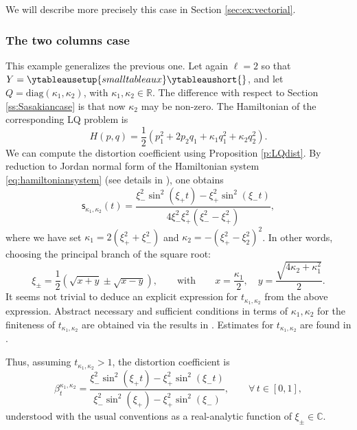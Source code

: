 \documentclass[11pt,a4paper]{article}
\theoremstyle{plain}
\theoremstyle{definition}
\theoremstyle{remark}
\numberwithin{equation}{section}
\newcommand{\R}{\mathbb{R}} %
\newcommand{\sfs}{\mathsf{s}}
\begin{document}
We will describe more precisely this case in Section \ref{sec:ex:vectorial}.

\subsubsection{The two columns case}\label{ss:twocolumnscase}

This example generalizes the previous one. Let again $\ell =2$ so that $Y=\ytableausetup{smalltableaux}\ytableaushort{\empty\empty}$, and let $Q = \mathrm{diag}(\kappa_1,\kappa_2)$, with $\kappa_1,\kappa_2 \in \R$. The difference with respect to Section \ref{ss:Sasakiancase} is that now $\kappa_2$ may be non-zero. The Hamiltonian of the corresponding LQ problem is
\begin{equation}
H(p,q) = \frac{1}{2} \left(p_1^2 +2p_{2}q_{1}+\kappa_{1} q_{1}^2+\kappa_{2}q_{2}^{2}\right).
\end{equation}
We can compute the distortion coefficient using Proposition \ref{p:LQdist}. By reduction to Jordan normal form of the Hamiltonian system \eqref{eq:hamiltoniansystem} (see details in \cite[Prop.\@ 28]{RS-3Sas}), one obtains
\begin{equation}
\sfs_{\kappa_1,\kappa_2}(t)=\frac{\xi _-^2 \sin ^2\left(\xi _+ t\right)-\xi _+^2 \sin ^2\left(\xi _- t\right)}{4 \xi _-^2 \xi _+^2(\xi _-^2- \xi _+^2)},
\end{equation} 
where we have set $\kappa_1 = 2 (\xi_+^2 + \xi_-^2)$ and $\kappa_2 = -(\xi_+^2-\xi_2^2)^2$. In other words, choosing the principal branch of the square root:
\begin{equation}
\xi_{\pm}= \frac{1}{2}(\sqrt{x+y} \pm \sqrt{x-y}),\qquad \text{with} \qquad x = \frac{\kappa_1}{2}, \quad y = \frac{\sqrt{4\kappa_2 + \kappa_1^2}}{2}.
\end{equation}
It seems not trivial to deduce an explicit expression for $t_{\kappa_1,\kappa_2}$ from the above expression. Abstract necessary and sufficient conditions in terms of $\kappa_1,\kappa_2$ for the finiteness of $t_{\kappa_1,\kappa_2}$ are obtained via the results in \cite{ARS-LQ}. Estimates for $t_{\kappa_1,\kappa_2}$ are found in \cite[Prop.\@ 1]{RS-3Sas}.

Thus, assuming $t_{\kappa_1,\kappa_2} >1$, the distortion coefficient is
\begin{equation}
\beta_{t}^{\kappa_1,\kappa_2}= \frac{\xi _-^2 \sin ^2\left(\xi _+ t\right)-\xi _+^2 \sin ^2\left(\xi _- t\right)}{\xi _-^2 \sin ^2\left(\xi _+ \right)-\xi _+^2 \sin ^2\left(\xi _- \right)}, \qquad \forall\, t\in [0,1],
\end{equation}
understood with the usual conventions as a real-analytic function of $\xi_{\pm} \in \mathbb{C}$. 
\end{document}
